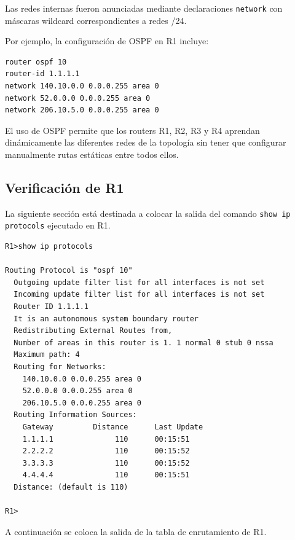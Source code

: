 \documentclass[12pt,a4paper]{article}
\begin{document}
Las redes internas fueron anunciadas mediante declaraciones \texttt{network} con máscaras wildcard correspondientes a redes /24.

Por ejemplo, la configuración de OSPF en R1 incluye:

\begin{lstlisting}[style=cisco]
router ospf 10
router-id 1.1.1.1
network 140.10.0.0 0.0.0.255 area 0
network 52.0.0.0 0.0.0.255 area 0
network 206.10.5.0 0.0.0.255 area 0
\end{lstlisting}

El uso de OSPF permite que los routers R1, R2, R3 y R4 aprendan dinámicamente las diferentes redes de la topología sin tener que configurar manualmente rutas estáticas entre todos ellos.

\subsection{Verificación de R1}

La siguiente sección está destinada a colocar la salida del comando \texttt{show ip protocols} ejecutado en R1.

\begin{verbatim}
R1>show ip protocols

Routing Protocol is "ospf 10"
  Outgoing update filter list for all interfaces is not set 
  Incoming update filter list for all interfaces is not set 
  Router ID 1.1.1.1
  It is an autonomous system boundary router
  Redistributing External Routes from,
  Number of areas in this router is 1. 1 normal 0 stub 0 nssa
  Maximum path: 4
  Routing for Networks:
    140.10.0.0 0.0.0.255 area 0
    52.0.0.0 0.0.0.255 area 0
    206.10.5.0 0.0.0.255 area 0
  Routing Information Sources:  
    Gateway         Distance      Last Update 
    1.1.1.1              110      00:15:51
    2.2.2.2              110      00:15:52
    3.3.3.3              110      00:15:52
    4.4.4.4              110      00:15:51
  Distance: (default is 110)

R1>
\end{verbatim}

A continuación se coloca la salida de la tabla de enrutamiento de R1.
\end{document}
